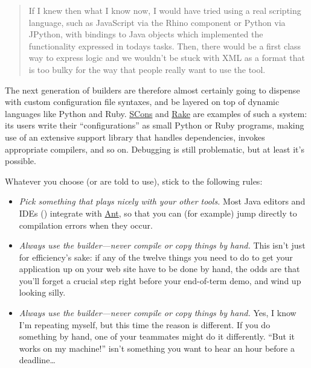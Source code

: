 \documentclass{report}
\begin{document}
\begin{quotation}

  If I knew then what I know now, I would have tried using a real
  scripting language, such as JavaScript via the Rhino component or
  Python via JPython, with bindings to Java objects which implemented
  the functionality expressed in todays tasks. Then, there would be a
  first class way to express logic and we wouldn't be stuck with XML
  as a format that is too bulky for the way that people really want to
  use the tool.

\end{quotation}

The next generation of builders are therefore almost certainly going
to dispense with custom configuration file syntaxes, and be layered on
top of dynamic languages like Python and Ruby.  \url{SCons} and
\url{Rake} are examples of such a system: its users write their
``configurations'' as small Python or Ruby programs, making use of an
extensive support library that handles dependencies, invokes
appropriate compilers, and so on.  Debugging is still problematic, but
at least it's possible.

Whatever you choose (or are told to use), stick to the following
rules:

\begin{itemize}

  \item \emph{Pick something that plays nicely with your other tools.}
  Most Java editors and IDEs () integrate with
  \url{Ant}, so that you can (for example) jump directly to
  compilation errors when they occur.

  \item \emph{Always use the builder---never compile or copy things by
  hand.} This isn't just for efficiency's sake: if any of the twelve
  things you need to do to get your application up on your web site
  have to be done by hand, the odds are that you'll forget a crucial
  step right before your end-of-term demo, and wind up looking silly.

  \item \emph{Always use the builder---never compile or copy things by
  hand.} Yes, I know I'm repeating myself, but this time the reason is
  different.  If you do something by hand, one of your teammates might
  do it differently.  ``But it works on my machine!''  isn't something
  you want to hear an hour before a deadline{\ldots}

\end{itemize}
\end{document}
